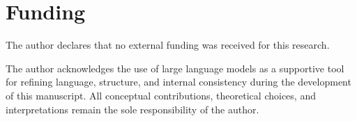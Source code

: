 \documentclass[pdflatex,sn-mathphys-num]{sn-jnl} %
\theoremstyle{remark}
\begin{document}
    \appendix

    \backmatter

  \section*{Funding}
  The author declares that no external funding was received for this research.

  The author acknowledges the use of large language models as a supportive tool
  for refining language, structure, and internal consistency during the
  development of this manuscript.
  All conceptual contributions, theoretical choices, and interpretations remain the sole responsibility of the author.

  
\end{document}
